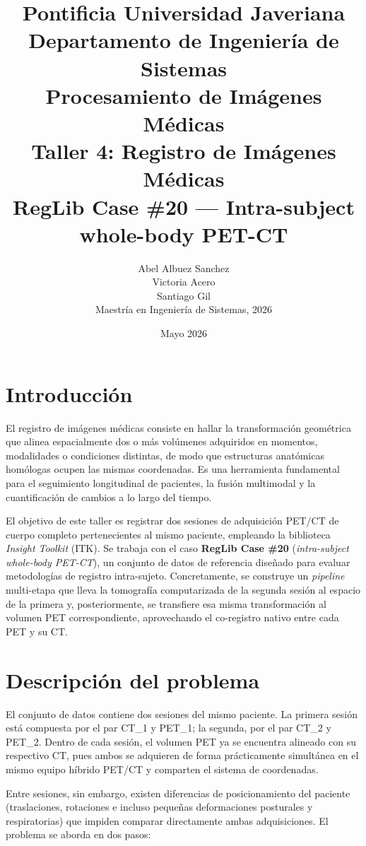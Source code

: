 \documentclass[12pt, letterpaper]{article}
\title{
    \large Pontificia Universidad Javeriana \\
    Departamento de Ingeniería de Sistemas \\
    Procesamiento de Imágenes Médicas \\[1cm]
    \LARGE \textbf{Taller 4: Registro de Imágenes Médicas} \\
    \large RegLib Case \#20 — Intra-subject whole-body PET-CT
}
\author{
    Abel Albuez Sanchez \\
    Victoria Acero \\
    Santiago Gil \\[0.5cm]
    \small Maestría en Ingeniería de Sistemas, 2026
}
\date{Mayo 2026}
\begin{document}
\maketitle
\thispagestyle{empty}
\newpage

\section{Introducción}
El registro de imágenes médicas consiste en hallar la transformación geométrica
que alinea espacialmente dos o más volúmenes adquiridos en momentos, modalidades
o condiciones distintas, de modo que estructuras anatómicas homólogas ocupen las
mismas coordenadas. Es una herramienta fundamental para el seguimiento
longitudinal de pacientes, la fusión multimodal y la cuantificación de cambios a
lo largo del tiempo.

El objetivo de este taller es registrar dos sesiones de adquisición PET/CT de
cuerpo completo pertenecientes al mismo paciente, empleando la biblioteca
\textit{Insight Toolkit} (ITK). Se trabaja con el caso \textbf{RegLib Case \#20}
(\textit{intra-subject whole-body PET-CT}), un conjunto de datos de referencia
diseñado para evaluar metodologías de registro intra-sujeto. Concretamente, se
construye un \textit{pipeline} multi-etapa que lleva la tomografía computarizada
de la segunda sesión al espacio de la primera y, posteriormente, se transfiere
esa misma transformación al volumen PET correspondiente, aprovechando el
co-registro nativo entre cada PET y su CT.

\section{Descripción del problema}
El conjunto de datos contiene dos sesiones del mismo paciente. La primera sesión
está compuesta por el par CT\_1 y PET\_1; la segunda, por el par CT\_2 y PET\_2.
Dentro de cada sesión, el volumen PET ya se encuentra alineado con su respectivo
CT, pues ambos se adquieren de forma prácticamente simultánea en el mismo equipo
híbrido PET/CT y comparten el sistema de coordenadas.

Entre sesiones, sin embargo, existen diferencias de posicionamiento del paciente
(traslaciones, rotaciones e incluso pequeñas deformaciones posturales y
respiratorias) que impiden comparar directamente ambas adquisiciones. El problema
se aborda en dos pasos:
\end{document}
